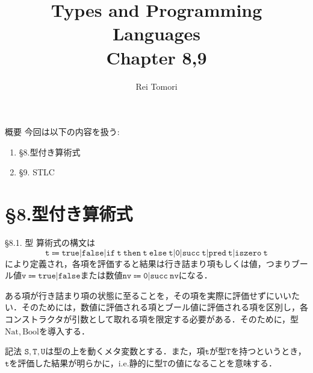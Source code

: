 \documentclass[9pt]{beamer}
\title{Types and Programming Languages\\ Chapter 8,9}
\author{Rei Tomori}
\begin{document}
\maketitle
\begin{frame}{概要}
	今回は以下の内容を扱う: \begin{enumerate}
        \item \S 8.型付き算術式
        \item \S9. STLC
    \end{enumerate}
\end{frame}

\section{\S8.型付き算術式}
\begin{frame}{\S 8.1. 型}
算術式の構文は\begin{equation*}
\mathtt{t\Coloneq true|false|if\ t\ then\ t\ else\ t|0|succ\ t|pred\ t|iszero\ t}
\end{equation*}
により定義され，各項を評価すると結果は行き詰まり項もしくは値，つまりブール値$\mathtt{v\Coloneq true|false}$または数値$\mathtt{nv\Coloneq 0|succ\ nv}$になる．

ある項が行き詰まり項の状態に至ることを，その項を実際に評価せずにいいたい．そのためには，数値に評価される項とブール値に評価される項を区別し，各コンストラクタが引数として取れる項を限定する必要がある．そのために，型$\mathrm{Nat, Bool}$を導入する．
\begin{alertblock}{記法}
	$\mathtt{S, T,U}$は型の上を動くメタ変数とする．また，項$\mathtt{t}$が型$\mathtt{T}$を持つというとき，$\mathtt{t}$を評価した結果が明らかに，i.e.静的に型$\mathtt{T}$の値になることを意味する．
\end{alertblock}
\end{frame}
\end{document}
